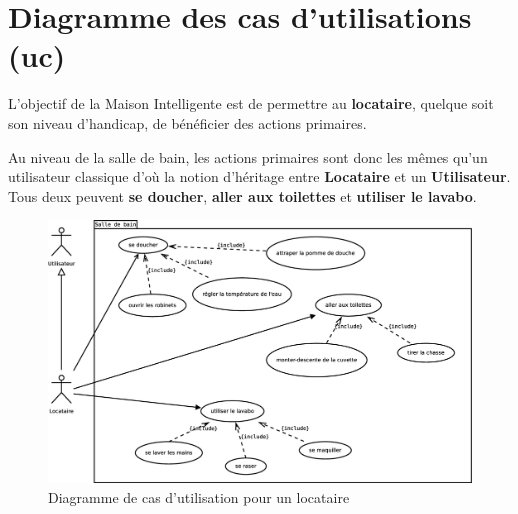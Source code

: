 \chapter{Diagramme des cas d'utilisations (uc)}
L'objectif de la Maison Intelligente est de permettre au \textbf{locataire}, quelque soit son niveau d'handicap, de bénéficier des actions primaires. 

Au niveau de la salle de bain, les actions primaires sont donc les mêmes qu'un utilisateur classique d'où la notion d'héritage entre \textbf{Locataire} et un \textbf{Utilisateur}. Tous deux peuvent \textbf{se doucher}, \textbf{aller aux toilettes} et \textbf{utiliser le lavabo}. \\

\begin{figure}
	\centering
	\includegraphics[width=1\linewidth]{diagrams/bathroom/diagramme_cas_utilisation_uc.eps}
	\caption{Diagramme de cas d'utilisation pour un locataire}
	\label{fig:diagramme_cas_utilisation_uc}
\end{figure}

